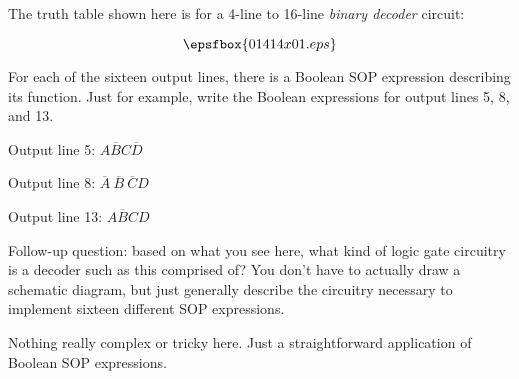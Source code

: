 

The truth table shown here is for a 4-line to 16-line {\it binary decoder} circuit:

$$\epsfbox{01414x01.eps}$$

For each of the sixteen output lines, there is a Boolean SOP expression describing its function.  Just for example, write the Boolean expressions for output lines 5, 8, and 13.







Output line 5: $A\overline{B}C\overline{D}$

Output line 8: $\overline{A} \> \overline{B} \> \overline{C} D$

Output line 13: $A\overline{B}CD$

\vskip 10pt

Follow-up question: based on what you see here, what kind of logic gate circuitry is a decoder such as this comprised of?  You don't have to actually draw a schematic diagram, but just generally describe the circuitry necessary to implement sixteen different SOP expressions.







Nothing really complex or tricky here.  Just a straightforward application of Boolean SOP expressions.




